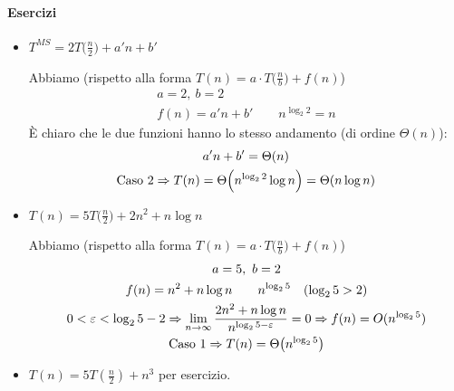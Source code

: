 \paragraph{Esercizi}
\begin{itemize}[label=$\bullet$]
    \item $T^{MS} = 2T\big(\frac{n}{2}\big) + a'n + b'$ \par
    Abbiamo (rispetto alla forma $T(n) = a \cdot T\big(\frac{n}{b}\big) + f(n)$)
    \begin{gather*}
        a = 2, \ b = 2 \\
        f(n) = a'n + b' \qquad n^{\log_2 2} = n
    \end{gather*}
    È chiaro che le due funzioni hanno lo stesso andamento (di ordine $\Theta(n)$):
    \begin{gather*}
        a'n + b' = \Theta (n) \\
        \text{\emph{Caso 2}} \Rightarrow T(n) = \Theta \Big(n^{\log_2 2} \log n \Big) = \Theta (n \log n)
    \end{gather*}

    \item $T(n) = 5T\big( \frac{n}{2} \big) + 2n^2 + n \log n$ \par
    Abbiamo (rispetto alla forma $T(n) = a \cdot T\big(\frac{n}{b}\big) + f(n)$)
    \begin{gather*}
        a = 5, \ b = 2 \\
        f(n) = n^2 + n \log n \qquad n^{\log_2 5} \quad (\log_2 5 > 2) \\
        0 < \varepsilon < \log_2 5 - 2 \Rightarrow 
            \lim_{n \to \infty} \frac{2n^2 + n \log n}{n^{\log_2 5 - \varepsilon}} = 0 
            \Rightarrow f(n) = O(n^{\log_2 5}) \\
        \text{\emph{Caso 1}} \Rightarrow T(n) = \Theta \big( n^{\log_2 5} \big)
    \end{gather*}

    \item $T(n) = 5T(\frac{n}{2}) + n^3$ per esercizio.


\end{itemize}
